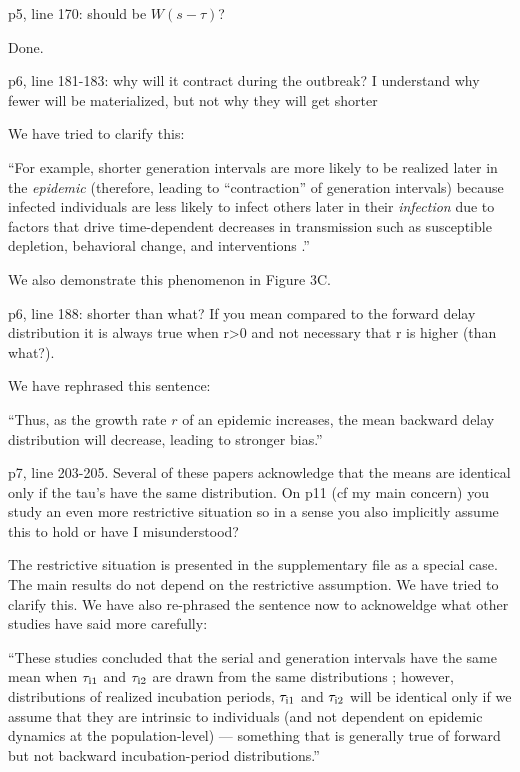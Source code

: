 \documentclass[12pt]{article}
\newcommand{\revtext}{\textsf}
\begin{document}
\revtext{p5, line 170: should be $W(s-\tau)$?}

Done.

\revtext{p6, line 181-183: why will it contract during the outbreak? I understand why fewer will be materialized, but not why they will get shorter}

We have tried to clarify this:

``For example, shorter generation intervals are more likely to be realized later in the \emph{epidemic} (therefore, leading to ``contraction'' of generation intervals) because infected individuals are less likely to infect others later in their \emph{infection} due to factors that drive time-dependent decreases in transmission such as susceptible depletion, behavioral change, and interventions \citep{champredon2015intrinsic}.''

We also demonstrate this phenomenon in Figure 3C.

\revtext{p6, line 188: shorter than what? If you mean compared to the forward delay distribution it is always true when r>0 and not necessary that r is higher (than what?).}

We have rephrased this sentence:

``Thus, as the growth rate $r$ of an epidemic increases, the mean backward delay distribution will decrease, leading to stronger bias.''

\revtext{p7, line 203-205. Several of these papers acknowledge that the means are identical only if the tau's have the same distribution. On p11 (cf my main concern) you study an even more restrictive situation so in a sense you also implicitly assume this to hold or have I misunderstood?}

The restrictive situation is presented in the supplementary file as a special case. The main results do not depend on the restrictive assumption. We have tried to clarify this. We have also re-phrased the sentence now to acknoweldge what other studies have said more carefully:

``These studies concluded that the serial and generation intervals have the same mean when $\tau_{\rm i1}$ and $\tau_{\rm i2}$ are drawn from the same distributions \citep{svensson2007note,klinkenberg2011correlation,champredon2018equivalence, britton2019estimation};
however, distributions of realized incubation periods, $\tau_{\rm i1}$ and $\tau_{\rm i2}$ will be identical only if we assume that they are intrinsic to individuals (and not dependent on epidemic dynamics at the population-level) ---
something that is generally true of forward but not backward incubation-period distributions.''
\end{document}

